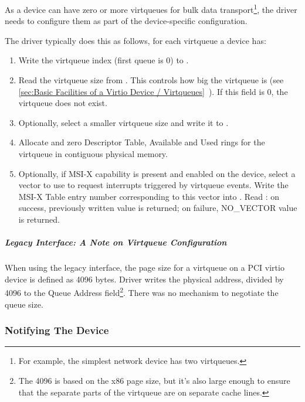 As a device can have zero or more virtqueues for bulk data
transport\footnote{For example, the simplest network device has two virtqueues.}, the driver
needs to configure them as part of the device-specific
configuration.

The driver typically does this as follows, for each virtqueue a device has:

\begin{enumerate}
\item Write the virtqueue index (first queue is 0) to .

\item Read the virtqueue size from . This controls how big the virtqueue is
  (see \ref{sec:Basic Facilities of a Virtio Device / Virtqueues}~). If this field is 0, the virtqueue does not exist.

\item Optionally, select a smaller virtqueue size and write it to .

\item Allocate and zero Descriptor Table, Available and Used rings for the
   virtqueue in contiguous physical memory.

\item Optionally, if MSI-X capability is present and enabled on the
  device, select a vector to use to request interrupts triggered
  by virtqueue events. Write the MSI-X Table entry number
  corresponding to this vector into . Read
  : on success, previously written value is
  returned; on failure, NO_VECTOR value is returned.
\end{enumerate}

\subparagraph{Legacy Interface: A Note on Virtqueue Configuration}\label{sec:Virtio Transport Options / Virtio Over PCI Bus / PCI-specific Initialization And Device Operation / Device Initialization / Virtqueue Configuration / Legacy Interface: A Note on Virtqueue Configuration}
When using the legacy interface, the page size for a virtqueue on a PCI virtio
device is defined as 4096 bytes.  Driver writes the physical address, divided
by 4096 to the Queue Address field\footnote{The 4096 is based on the x86 page size, but it's also large
enough to ensure that the separate parts of the virtqueue are on
separate cache lines.
}.  There was no mechanism to negotiate the queue size.

\subsubsection{Notifying The Device}\label{sec:Virtio Transport Options / Virtio Over PCI Bus / PCI-specific Initialization And Device Operation / Notifying The Device}

